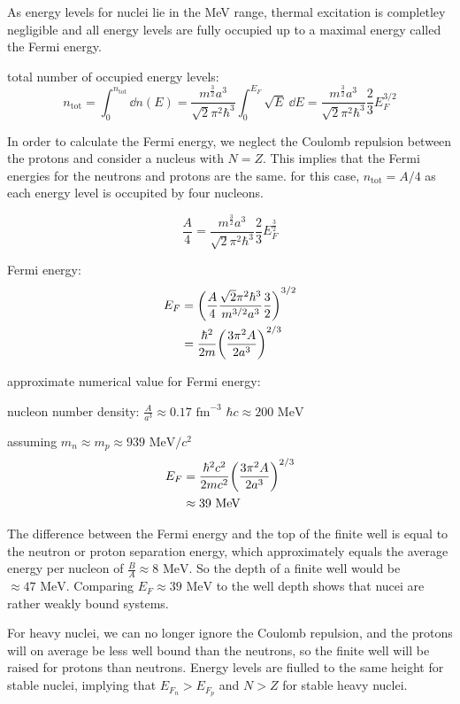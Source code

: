 \documentclass[10pt, a4paper, twocolumn]{article}
\newcommand{\n}{\par \noindent}
\begin{document}
As energy levels for nuclei lie in the MeV range, thermal excitation is completley negligible and all energy levels are fully occupied up to a maximal energy called the Fermi energy.

total number of occupied energy levels:
\[n_\text{tot} = \int _0^{n_\text{tot}} \dd n(E)
= \frac{m^\frac32 a^3}{\sqrt 2 \pi ^2 \hbar ^3}
\int _0^{E_F} \sqrt E \ \dd E
= \frac{m^\frac32 a^3}{\sqrt 2 \pi ^2 \hbar ^3}
\frac23 E_F^{3/2} \]

In order to calculate the Fermi energy, we neglect the Coulomb repulsion between the protons and consider a nucleus with $N=Z$. This implies that the Fermi energies for the neutrons and protons are the same. for this case, $n_\text{tot} = A/4$ as each energy level is occupited by four nucleons.

\[\frac{A}{4}
= \frac{m^\frac32 a^3}{\sqrt 2 \pi ^2 \hbar ^3}
\frac23 E_F^\frac32 \]

Fermi energy:
\begin{equation*}
\begin{aligned}
E_F &= \left(\frac{A}{4}
\frac{\sqrt 2 \pi ^2\hbar ^3}{m^{3/2}a^3}\frac32
\right)^{3/2}
\\&=\frac{\hbar ^2}{2m}\qty(\frac{3\pi ^2 A}{2a^3})^{2/3}
\end{aligned}
\end{equation*}

approximate numerical value for Fermi energy:
\n nucleon number density: $\frac{A}{a^3}\approx 0.17
\text{ fm}^{-3}$
$\hbar c \approx 200 \text{ MeV}$
\n assuming $m_n\approx m_p\approx 939\text{ MeV}/c^2$
\begin{equation*}
\begin{aligned}
E_F&=
\frac{\hbar ^2c^2}{2mc^2}\qty(\frac{3\pi ^2 A}{2a^3})^{2/3}
\\&\approx 39 \text{ MeV}
\end{aligned}
\end{equation*}

The difference between the Fermi energy and the top of the finite well is equal to the neutron or proton separation energy, which approximately equals the average energy per nucleon of $\frac{B}{A}\approx 8\text{ MeV}$. So the depth of a finite well would be $\approx 47\text{ MeV}$. Comparing $E_F\approx 39\text{ MeV}$ to the well depth shows that nucei are rather weakly bound systems.

For heavy nuclei, we can no longer ignore the Coulomb repulsion, and the protons will on average be less well bound than the neutrons, so the finite well will be raised for protons than neutrons. Energy levels are fiulled to the same height for stable nuclei, implying that $E_{F_n} >E_{F_p}$ and $N>Z$ for stable heavy nuclei.
\end{document}

